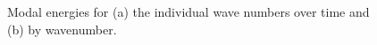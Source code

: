 \documentclass[11pt,a4paper]{report}
\begin{document}
\begin{figure}
   \centering
    \caption{Modal energies for (a) the individual wave numbers over
      time and (b) by wavenumber.}
    \label{pic:modal_en}
\end{figure}
\end{document}
